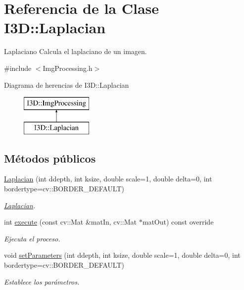 \hypertarget{class_i3_d_1_1_laplacian}{}\section{Referencia de la Clase I3D\+:\+:Laplacian}
\label{class_i3_d_1_1_laplacian}


Laplaciano Calcula el laplaciano de un imagen.  




{\ttfamily \#include $<$Img\+Processing.\+h$>$}

Diagrama de herencias de I3D\+:\+:Laplacian\begin{figure}[H]
\begin{center}
\leavevmode
\includegraphics[height=2.000000cm]{class_i3_d_1_1_laplacian}
\end{center}
\end{figure}
\subsection*{Métodos públicos}
\begin{DoxyCompactItemize}
\item 
\hyperlink{class_i3_d_1_1_laplacian_a660abad9d6ad7cbe96544cca51d32e40}{Laplacian} (int ddepth, int ksize, double scale=1, double delta=0, int bordertype=cv\+::\+B\+O\+R\+D\+E\+R\+\_\+\+D\+E\+F\+A\+U\+LT)
\begin{DoxyCompactList}\small\item\em \hyperlink{class_i3_d_1_1_laplacian}{Laplacian}. \end{DoxyCompactList}\item 
int \hyperlink{class_i3_d_1_1_laplacian_a7e14ea57d17b73a74058083a809fa5c3}{execute} (const cv\+::\+Mat \&mat\+In, cv\+::\+Mat $\ast$mat\+Out) const  override
\begin{DoxyCompactList}\small\item\em Ejecuta el proceso. \end{DoxyCompactList}\item 
void \hyperlink{class_i3_d_1_1_laplacian_a5ac3f547a4832a13059e12941328bf58}{set\+Parameters} (int ddepth, int ksize, double scale=1, double delta=0, int bordertype=cv\+::\+B\+O\+R\+D\+E\+R\+\_\+\+D\+E\+F\+A\+U\+LT)
\begin{DoxyCompactList}\small\item\em Establece los parámetros. \end{DoxyCompactList}\end{DoxyCompactItemize}
